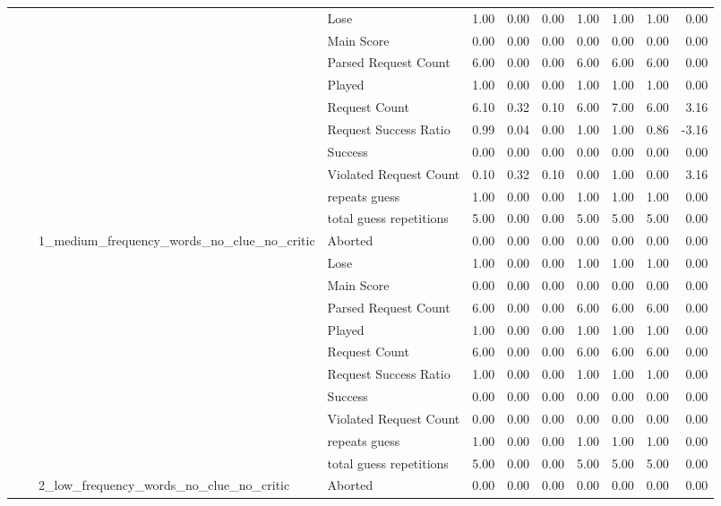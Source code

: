 \begin{tabular}{llllrrrrrrr}
 &  &  & Lose & 1.00 & 0.00 & 0.00 & 1.00 & 1.00 & 1.00 & 0.00 \\
 &  &  & Main Score & 0.00 & 0.00 & 0.00 & 0.00 & 0.00 & 0.00 & 0.00 \\
 &  &  & Parsed Request Count & 6.00 & 0.00 & 0.00 & 6.00 & 6.00 & 6.00 & 0.00 \\
 &  &  & Played & 1.00 & 0.00 & 0.00 & 1.00 & 1.00 & 1.00 & 0.00 \\
 &  &  & Request Count & 6.10 & 0.32 & 0.10 & 6.00 & 7.00 & 6.00 & 3.16 \\
 &  &  & Request Success Ratio & 0.99 & 0.04 & 0.00 & 1.00 & 1.00 & 0.86 & -3.16 \\
 &  &  & Success & 0.00 & 0.00 & 0.00 & 0.00 & 0.00 & 0.00 & 0.00 \\
 &  &  & Violated Request Count & 0.10 & 0.32 & 0.10 & 0.00 & 1.00 & 0.00 & 3.16 \\
 &  &  & repeats guess & 1.00 & 0.00 & 0.00 & 1.00 & 1.00 & 1.00 & 0.00 \\
 &  &  & total guess repetitions & 5.00 & 0.00 & 0.00 & 5.00 & 5.00 & 5.00 & 0.00 \\
\cline{3-11}
 &  & \multirow[t]{11}{*}{1_medium_frequency_words_no_clue_no_critic} & Aborted & 0.00 & 0.00 & 0.00 & 0.00 & 0.00 & 0.00 & 0.00 \\
 &  &  & Lose & 1.00 & 0.00 & 0.00 & 1.00 & 1.00 & 1.00 & 0.00 \\
 &  &  & Main Score & 0.00 & 0.00 & 0.00 & 0.00 & 0.00 & 0.00 & 0.00 \\
 &  &  & Parsed Request Count & 6.00 & 0.00 & 0.00 & 6.00 & 6.00 & 6.00 & 0.00 \\
 &  &  & Played & 1.00 & 0.00 & 0.00 & 1.00 & 1.00 & 1.00 & 0.00 \\
 &  &  & Request Count & 6.00 & 0.00 & 0.00 & 6.00 & 6.00 & 6.00 & 0.00 \\
 &  &  & Request Success Ratio & 1.00 & 0.00 & 0.00 & 1.00 & 1.00 & 1.00 & 0.00 \\
 &  &  & Success & 0.00 & 0.00 & 0.00 & 0.00 & 0.00 & 0.00 & 0.00 \\
 &  &  & Violated Request Count & 0.00 & 0.00 & 0.00 & 0.00 & 0.00 & 0.00 & 0.00 \\
 &  &  & repeats guess & 1.00 & 0.00 & 0.00 & 1.00 & 1.00 & 1.00 & 0.00 \\
 &  &  & total guess repetitions & 5.00 & 0.00 & 0.00 & 5.00 & 5.00 & 5.00 & 0.00 \\
\cline{3-11}
 &  & \multirow[t]{11}{*}{2_low_frequency_words_no_clue_no_critic} & Aborted & 0.00 & 0.00 & 0.00 & 0.00 & 0.00 & 0.00 & 0.00 \\

\end{tabular}
